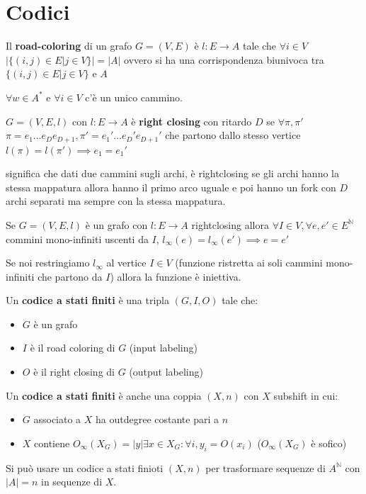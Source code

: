 \section{Codici}
\begin{definizione} 
    Il \textbf{road-coloring} di un grafo $G=(V,E)$ è $l:E\to A$ tale che $\forall
    i\in V$ $|\{(i,j)\in E|j\in V\}| = |A|$ ovvero si ha una corrispondenza biunivoca tra $\{(i,j)\in E|j\in V\}$ e $A$
\end{definizione}
\begin{nota}
    $\forall w \in A^\ast$ e $\forall i\in V$ c'è un unico cammino. 
\end{nota}
\begin{definizione}
    $G = (V,E,l)$ con $l:E\to A$ è \textbf{right closing} con ritardo $D$ se $\forall \pi,\pi'$
    $\pi = e_1\dots e_De_{D+1},\pi' = e_1'\dots e_D'e_{D+1}'$ che partono dallo 
    stesso vertice $l(\pi)=l(\pi')\implies e_1=e_1'$
\end{definizione}
significa che dati due cammini sugli archi, è rightclosing se gli archi hanno la 
stessa mappatura allora hanno il primo arco uguale e poi hanno un fork con $D$ 
archi separati ma sempre con la stessa mappatura.
\begin{nota}
    Se $G = (V,E,l)$  è un grafo con $l:E\to A$ rightclosing allora $\forall I\in V,
    \forall e,e'\in E^\mathbb{N}$ commini mono-infiniti uscenti da $I$, $l_\infty(e) = l_\infty(e') \implies e=e'$
\end{nota}
Se noi restringiamo $l_\infty$ al vertice $I\in V$ (funzione ristretta ai soli 
cammini mono-infiniti che partono da $I$) allora la funzione è iniettiva.

\begin{definizione}
    Un \textbf{codice a stati finiti} è una tripla $(G,I,O)$ tale che:
    \begin{itemize}
        \item $G$ è un grafo
        \item $I$ è il road coloring di $G$ (input labeling)
        \item $O$ è il right closing di $G$ (output labeling)
    \end{itemize}
\end{definizione}

\begin{definizione}
    Un \textbf{codice a stati finiti} è anche una coppia $(X,n)$ con $X$ subshift in cui:
    \begin{itemize}
        \item $G$ associato a $X$ ha outdegree costante pari a $n$ 
        \item $X$ contiene $O_\infty(X_G)=|{y | \exists x\in X_G:\forall i,y_i=O(x_i)}$ ($O_\infty(X_G)$ è sofico)
    \end{itemize}
\end{definizione}
Si può usare un codice a stati finioti $(X,n)$ per trasformare sequenze di $A^\mathbb{N}$
con $|A|=n$ in sequenze di $X$.

